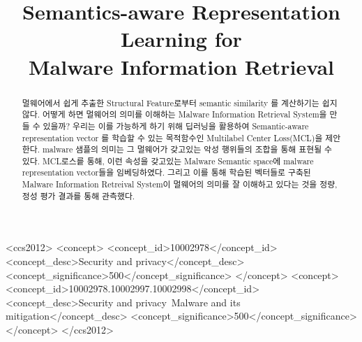 \documentclass[sigconf, anonymous]{acmart}
\begin{document}
\title{Semantics-aware Representation Learning for \\
Malware Information Retrieval} %

\begin{abstract}
멀웨어에서 쉽게 추출한 Structural Feature로부터 semantic similarity 를 계산하기는 쉽지 않다. 어떻게 하면 멀웨어의 의미를 이해하는 Malware Information Retrieval System을 만들 수 있을까? 우리는 이를 가능하게 하기 위해 딥러닝을 활용하여 Semantic-aware representation vector 를 학습할 수 있는 목적함수인 Multilabel Center Loss(MCL)을 제안한다. malware 샘플의 의미는 그 멀웨어가 갖고있는 악성 행위들의 조합을 통해 표현될 수 있다. MCL로스릍 통해, 이런 속성을 갖고있는 Malware Semantic space에 malware representation vector들을 임베딩하였다. 그리고 이를 통해 학습된 벡터들로 구축된 Malware Information Retreival System이 멀웨어의 의미를 잘 이해하고 있다는 것을 정량, 정성 평가 결과를 통해 관측했다. 


\end{abstract}

\begin{CCSXML}
<ccs2012>
<concept>
<concept_id>10002978</concept_id>
<concept_desc>Security and privacy</concept_desc>
<concept_significance>500</concept_significance>
</concept>
<concept>
<concept_id>10002978.10002997.10002998</concept_id>
<concept_desc>Security and privacy~Malware and its mitigation</concept_desc>
<concept_significance>500</concept_significance>
</concept>
</ccs2012>
\end{CCSXML}



\maketitle




\end{document}
